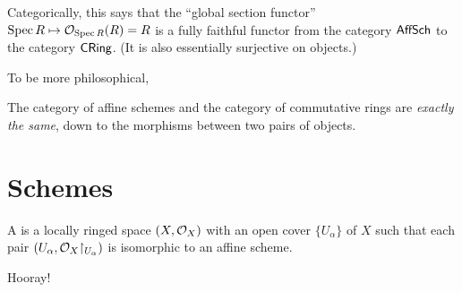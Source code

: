 \begin{remark}
	Categorically, this says that the ``global section functor''
	$\operatorname{Spec} R \mapsto \mathcal O_{\operatorname{Spec} R}(R) = R$ is a fully faithful functor
	from the category $\mathsf{AffSch}$ to the category $\mathsf{CRing}$.
	(It is also essentially surjective on objects.)
\end{remark}
To be more philosophical,
\begin{moral}
	The category of affine schemes and the
	category of commutative rings are \emph{exactly the same},
	down to the morphisms between two pairs of objects.
\end{moral}

\section{Schemes}
\begin{definition}
	A  is a locally ringed space $(X, \mathcal O_X)$
	with an open cover $\{U_\alpha\}$ of $X$
	such that each pair $(U_\alpha, \OO_X \restrict{U_\alpha})$
	is isomorphic to an affine scheme.
\end{definition}
Hooray!

